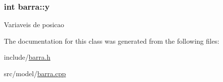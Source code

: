 \subsubsection[{\texorpdfstring{y}{y}}]{\setlength{\rightskip}{0pt plus 5cm}int barra\+::y\hspace{0.3cm}{\ttfamily [private]}}\hypertarget{classbarra_a93b604008af3593ac1b80366c387f2e9}{}\label{classbarra_a93b604008af3593ac1b80366c387f2e9}
Variaveis de posicao 

The documentation for this class was generated from the following files\+:\begin{DoxyCompactItemize}
\item 
include/\hyperlink{barra_8h}{barra.\+h}\item 
src/model/\hyperlink{barra_8cpp}{barra.\+cpp}\end{DoxyCompactItemize}
